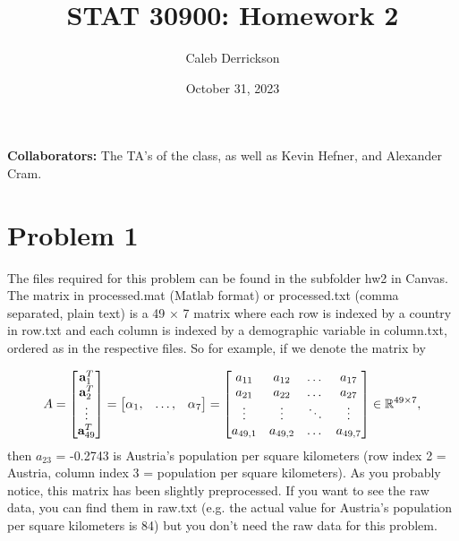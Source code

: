 

\title{STAT 30900: Homework 2}
\author{Caleb Derrickson}
\date{October 31, 2023}


\onehalfspacing
\maketitle

{\color{cit}\vspace{2mm}\noindent\textbf{Collaborators:}} The TA's of the class, as well as Kevin Hefner, and Alexander Cram.

\tableofcontents

\newpage
\section{Problem 1}
The files required for this problem can be found in the subfolder hw2 in Canvas. The matrix in processed.mat (Matlab format) or processed.txt (comma separated, plain text) is a 49 × 7 matrix where each row is indexed by a country in row.txt and each column is indexed by a demographic variable in column.txt, ordered as in the respective files. So for example, if we denote the matrix by

\[
A 
= 
\begin{bmatrix}\textbf{a}_1^T \\ \textbf{a}_2^T \\ \vdots \\ \textbf{a}_{49}^T\end{bmatrix}
=
\begin{bmatrix} \textbf{$\alpha$}_1,&\dots,&\textbf{$\alpha$}_7\end{bmatrix}
=
\begin{bmatrix}
    a_{11} &a_{12} &\dots &a_{17} \\
    a_{21} &a_{22} &\dots &a_{27} \\
    \vdots &\vdots &\ddots &\vdots \\
    a_{49,1} &a_{49,2} &\dots &a_{49,7}
\end{bmatrix}
\in \mathbb{R}^{49\times 7},
\]
then $a_{23}$ = -0.2743 is Austria’s population per square kilometers (row index 2 = Austria, column index 3 = population per square kilometers). As you probably notice, this matrix has been slightly preprocessed. If you want to see the raw data, you can find them in raw.txt (e.g. the actual value for Austria’s population per square kilometers is 84) but you don’t need the raw data for this problem.

